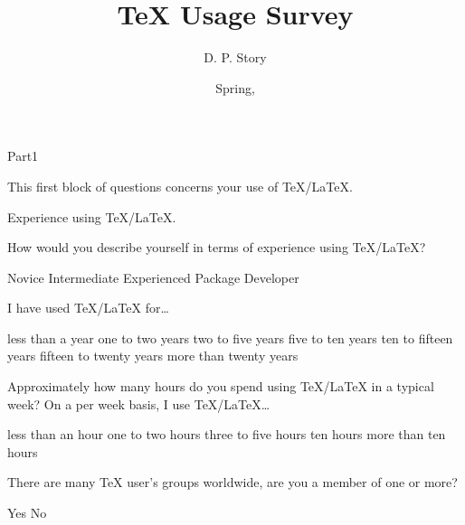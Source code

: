 \documentclass{article}
\title[TS]{\texorpdfstring{\TeX}{\textbackslash TeX} Usage Survey}
\author{D. P. Story}
\date{Spring, \the\year}
\begin{document}
\maketitle

\begin{exam}{Part1}

\begin{instructions}
This first block of questions concerns your use of {\TeX/\LaTeX}.
\end{instructions}

\begin{problem*}
Experience using \TeX/\LaTeX.
\begin{parts}
\item How would you describe yourself in terms of experience using \TeX/\LaTeX?
\begin{answers}{4}
\rowsep{1bp}
\bChoices
     Novice\eAns
     Intermediate\eAns
     Experienced\eAns
     Package Developer\eAns
\eChoices
\end{answers}

\item I have used \TeX/\LaTeX{} for\dots
\begin{answers}{3}
\rowsep{1bp}
\bChoices
     less than a year\eAns
     one to two years\eAns
     two to five years\eAns
     five to ten years\eAns
     ten to fifteen years\eAns
     fifteen to twenty years\eAns
     more than twenty years\eAns
\eChoices
\end{answers}

\end{parts}
\end{problem*}

\begin{problem}
Approximately how many hours do you spend using \TeX/\LaTeX{} in a typical week?
On a per week basis, I use \TeX/\LaTeX\dots
\begin{answers}{4}
\rowsep{1bp}
\bChoices
     less than an hour\eAns
     one to two hours\eAns
     three to five hours\eAns
     ten hours\eAns
     more than ten hours\eAns
\eChoices
\end{answers}
\end{problem}

\begin{problem}
There are many {\TeX} user's groups worldwide, are you a member of one or more?
\begin{answers}{4}
\bChoices
     Yes\eAns
     No\eAns
\eChoices
\end{answers}
\end{problem}


\end{exam}
\end{document}

